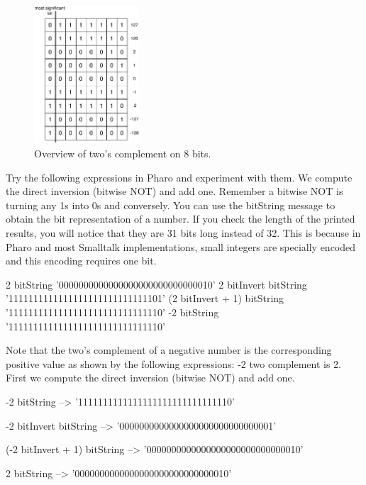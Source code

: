 \documentclass[a4paper,10pt,twoside]{book}
\begin{document}
\begin{figure}[h]
\begin{center}
\includegraphics[width=0.35\textwidth]{8bits-Table}
\caption{Overview of two's complement on 8 bits.\label{negativePositive}}
\end{center}
\end{figure}



Try the following expressions in Pharo and experiment with them. We compute the direct inversion (bitwise NOT) and add one. 
Remember a bitwise NOT is turning any 1s into 0s and conversely. You can use the bitString message to obtain the bit representation of a number. If you check the length of the printed results, you will notice that they are 31 bits long instead of 32. This is because in Pharo and most Smalltalk implementations, small integers are specially encoded and this encoding requires one bit.


\begin{code}{}
2 bitString 
			'0000000000000000000000000000010'
2 bitInvert bitString 
			'1111111111111111111111111111101'
(2 bitInvert + 1) bitString 
			'1111111111111111111111111111110'
-2 bitString 
			'1111111111111111111111111111110'		 
\end{code}


Note that the two's complement of a negative number is the corresponding positive value as shown by the following expressions: -2 two complement is 2. First we compute the direct inversion (bitwise NOT) and add one. 

\begin{code}{}
-2 bitString 
	--> '1111111111111111111111111111110'
	
-2 bitInvert bitString  
	--> '0000000000000000000000000000001'
	
(-2 bitInvert + 1) bitString   
	--> '0000000000000000000000000000010'

2 bitString 
 	--> '0000000000000000000000000000010'
\end{code}
\end{document}
